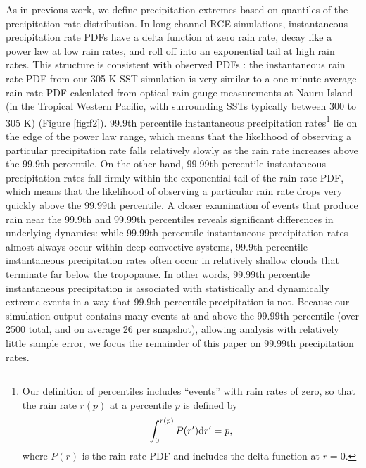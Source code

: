 \documentclass[twocol]{ametsoc}
\begin{document}
As in previous work, we define precipitation extremes based on quantiles of the precipitation rate distribution. In long-channel RCE simulations, instantaneous precipitation rate PDFs have a delta function at zero rain rate, decay like a power law at low rain rates, and roll off into an exponential tail at high rain rates. This structure is consistent with observed PDFs \citep{Martinez-Villalobos2019WhyDistributions}: the instantaneous rain rate PDF from our 305 K SST simulation is very similar to a one-minute-average rain rate PDF calculated from optical rain gauge measurements at Nauru Island (in the Tropical Western Pacific, with surrounding SSTs typically between 300 to 305 K) (Figure \ref{fig:f2}). 99.9th percentile instantaneous precipitation rates\footnote{Our definition of percentiles includes ``events'' with rain rates of zero, so that the rain rate $r(p)$ at a percentile $p$ is defined by
\begin{equation*}
\int_{0}^{r(p)} P(r') {\rm d}r' = p,
\end{equation*}
where $P(r)$ is the rain rate PDF and includes the delta function at $r = 0$.} lie on the edge of the power law range, which means that the likelihood of observing a particular precipitation rate falls relatively slowly as the rain rate increases above the 99.9th percentile. On the other hand, 99.99th percentile instantaneous precipitation rates fall firmly within the exponential tail of the rain rate PDF, which means that the likelihood of observing a particular rain rate drops very quickly above the 99.99th percentile. A closer examination of events that produce rain near the 99.9th and 99.99th percentiles reveals significant differences in underlying dynamics: while 99.99th percentile instantaneous precipitation rates almost always occur within deep convective systems, 99.9th percentile instantaneous precipitation rates often occur in relatively shallow clouds that terminate far below the tropopause. In other words, 99.99th percentile instantaneous precipitation is associated with statistically and dynamically extreme events in a way that 99.9th percentile precipitation is not. Because our simulation output contains many events at and above the 99.99th percentile (over 2500 total, and on average 26 per snapshot), allowing analysis with relatively little sample error, we focus the remainder of this paper on 99.99th precipitation rates.
\end{document}
